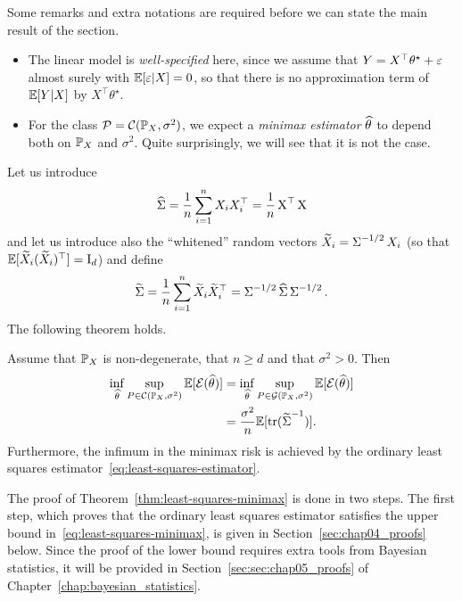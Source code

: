 Some remarks and extra notations are required before we can state the main result of the section.
\begin{itemize}
	\item The linear model is \emph{well-specified} here, since we assume that $Y = X^\top \theta^\star + \eps$ almost surely with $\E[\eps | X] = 0$, so that there is no approximation term of $\E[Y | X]$ by $X^\top \theta^\star$.
	\item For the class $\cP = \cC(\P_X, \sigma^2)$, we expect a \emph{minimax estimator}%
	 $\wh \theta$ to depend both on $\P_X$ and $\sigma^2$. Quite surprisingly, we will see that it is not the case.
\end{itemize}
Let us introduce
\begin{equation*}
	\wh \bSigma = \frac 1n \sum_{i=1}^n X_i X_i^\top = \frac 1n \bX^\top \bX
\end{equation*}
 and let us introduce also the ``whitened'' random vectors $\wt X_i = \bSigma^{-1/2} X_i$ (so that $\E[\wt X_i (\wt X_i)^\top] = \bI_d$) and define
\begin{equation*}
	\wt \bSigma = \frac 1n \sum_{i=1}^n \wt X_i \wt X_i^\top = \bSigma^{-1/2} \wh \bSigma \bSigma^{-1/2}.
\end{equation*}
The following theorem holds.
\begin{theorem}
	\label{thm:least-squares-minimax}
	Assume that $\P_X$ is non-degenerate, that $n \geq d$ and that $\sigma^2 > 0$. 
	Then
	\begin{equation}
		\label{eq:least-squares-minimax}
		\begin{split}
			\inf_{\wh \theta} \sup_{P \in \cC(\P_X, \sigma^2)} \E [\cE(\wh \theta)] 
			&= \inf_{\wh \theta} \sup_{P \in \cG(\P_X, \sigma^2)} \E [\cE(\wh \theta)] \\
			&= \frac{\sigma^2}{n} \E [\tr(\wt \bSigma ^{-1})].
		\end{split}
	\end{equation}
	Furthermore, the infimum in the minimax risk is achieved by the ordinary least squares estimator~\eqref{eq:least-squares-estimator}.
\end{theorem}

The proof of Theorem~\ref{thm:least-squares-minimax} is done in two steps.
The first step, which proves that the ordinary least squares estimator satisfies the upper bound in~\eqref{eq:least-squares-minimax}, is given in Section~\ref{sec:chap04_proofs} below.
Since the proof of the lower bound requires extra tools from Bayesian statistics, it will be provided in Section~\ref{sec:sec:chap05_proofs} of Chapter~\ref{chap:bayesian_statistics}.

